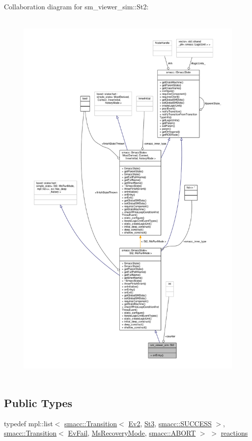 Collaboration diagram for sm\+\_\+viewer\+\_\+sim\+:\+:St2\+:\nopagebreak
\begin{figure}[H]
\begin{center}
\leavevmode
\includegraphics[height=550pt]{structsm__viewer__sim_1_1St2__coll__graph}
\end{center}
\end{figure}
\subsection*{Public Types}
\begin{DoxyCompactItemize}
\item 
typedef mpl\+::list$<$ \hyperlink{classsmacc_1_1Transition}{smacc\+::\+Transition}$<$ \hyperlink{structsm__viewer__sim_1_1Ev2}{Ev2}, \hyperlink{structsm__viewer__sim_1_1St3}{St3}, \hyperlink{structsmacc_1_1default__transition__tags_1_1SUCCESS}{smacc\+::\+S\+U\+C\+C\+E\+SS} $>$, \hyperlink{classsmacc_1_1Transition}{smacc\+::\+Transition}$<$ \hyperlink{structsm__viewer__sim_1_1EvFail}{Ev\+Fail}, \hyperlink{structsm__viewer__sim_1_1MsRecoveryMode}{Ms\+Recovery\+Mode}, \hyperlink{structsmacc_1_1default__transition__tags_1_1ABORT}{smacc\+::\+A\+B\+O\+RT} $>$ $>$ \hyperlink{structsm__viewer__sim_1_1St2_a37c15b5bdaf67bc96605679263915de8}{reactions}
\end{DoxyCompactItemize}
